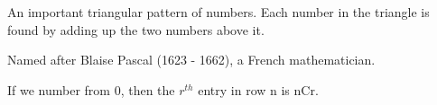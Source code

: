 An important triangular pattern of numbers.
Each number in the triangle is found by adding up the two numbers above it.

\par
Named after Blaise Pascal (1623 - 1662), a French mathematician.

\par
If we number from 0, then the $r^{th}$  entry in row n is nCr.